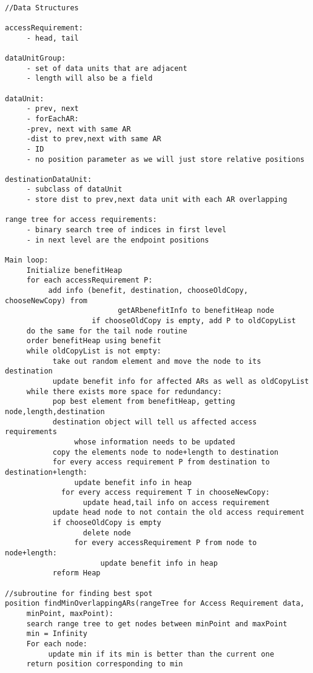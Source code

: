 \documentclass[11pt,psfig]{article}
\begin{document}
\begin{verbatim}

//Data Structures

accessRequirement:
     - head, tail

dataUnitGroup:
     - set of data units that are adjacent
     - length will also be a field

dataUnit:
     - prev, next
     - forEachAR:
     -prev, next with same AR
     -dist to prev,next with same AR
     - ID
     - no position parameter as we will just store relative positions

destinationDataUnit:
     - subclass of dataUnit
     - store dist to prev,next data unit with each AR overlapping

range tree for access requirements:
     - binary search tree of indices in first level
     - in next level are the endpoint positions

Main loop:
     Initialize benefitHeap
     for each accessRequirement P:
          add info (benefit, destination, chooseOldCopy, chooseNewCopy) from   
					      getARbenefitInfo to benefitHeap node
					if chooseOldCopy is empty, add P to oldCopyList
     do the same for the tail node routine
     order benefitHeap using benefit
     while oldCopyList is not empty:
           take out random element and move the node to its destination
           update benefit info for affected ARs as well as oldCopyList
     while there exists more space for redundancy:
           pop best element from benefitHeap, getting node,length,destination
           destination object will tell us affected access requirements 
                whose information needs to be updated
           copy the elements node to node+length to destination
           for every access requirement P from destination to destination+length:
                update benefit info in heap
	         for every access requirement T in chooseNewCopy:
	              update head,tail info on access requirement
           update head node to not contain the old access requirement
           if chooseOldCopy is empty
	              delete node
                for every accessRequirement P from node to node+length:
                      update benefit info in heap
           reform Heap

//subroutine for finding best spot
position findMinOverlappingARs(rangeTree for Access Requirement data, 
     minPoint, maxPoint):
     search range tree to get nodes between minPoint and maxPoint
     min = Infinity
     For each node:
          update min if its min is better than the current one
     return position corresponding to min


\end{verbatim}
\end{document}
